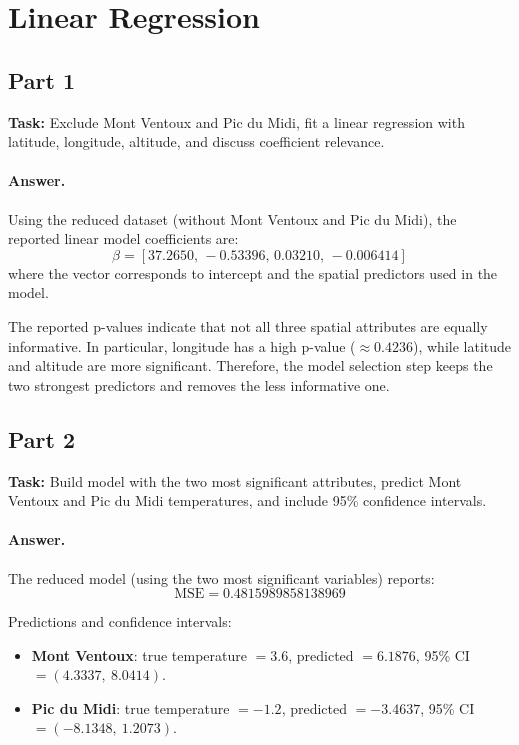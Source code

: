 \section{Linear Regression}

\subsection{Part 1}
\textbf{Task:} Exclude Mont Ventoux and Pic du Midi, fit a linear regression with latitude, longitude, altitude, and discuss coefficient relevance.

\paragraph{Answer.}
Using the reduced dataset (without Mont Ventoux and Pic du Midi), the reported linear model coefficients are:
\[
\beta = [37.2650,\,-0.53396,\,0.03210,\,-0.006414]
\]
where the vector corresponds to intercept and the spatial predictors used in the model.

The reported p-values indicate that not all three spatial attributes are equally informative. In particular, longitude has a high p-value (\(\approx 0.4236\)), while latitude and altitude are more significant. Therefore, the model selection step keeps the two strongest predictors and removes the less informative one.

\subsection{Part 2}
\textbf{Task:} Build model with the two most significant attributes, predict Mont Ventoux and Pic du Midi temperatures, and include 95\% confidence intervals.

\paragraph{Answer.}
The reduced model (using the two most significant variables) reports:
\[
\text{MSE} = 0.4815989858138969
\]

Predictions and confidence intervals:
\begin{itemize}
  \item \textbf{Mont Ventoux}: true temperature \(=3.6\), predicted \(=6.1876\), 95\% CI \(=(4.3337,\ 8.0414)\).
  \item \textbf{Pic du Midi}: true temperature \(=-1.2\), predicted \(=-3.4637\), 95\% CI \(=(-8.1348,\ 1.2073)\).
\end{itemize}

